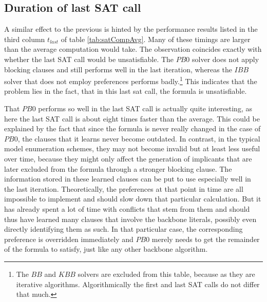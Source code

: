 



\subsection{Duration of last SAT call}
\label{ss:durLastCall}
A similar effect to the previous is hinted by the performance results listed in the third column $t_{last}$ of table \ref{tab:satCompAvg}. Many of these timings are larger than the average computation would take. The observation coincides exactly with whether the last SAT call would be unsatisfiable. The $PB0$ solver does not apply blocking clauses and still performs well in the last iteration, whereas the $IBB$ solver that does not employ preferences performs badly.\footnote{The $BB$ and $KBB$ solvers are excluded from this table, because as they are iterative algorithms. Algorithmically the first and last SAT calls do not differ that much.} This indicates that the problem lies in the fact, that in this last sat call, the formula is unsatisfiable.

That $PB0$ performs so well in the last SAT call is actually quite interesting, as here the last SAT call is about eight times faster than the average. This could be explained by the fact that since the formula is never really changed in the case of $PB0$, the clauses that it learns never become outdated. In contrast, in the typical model enumeration schemes, they may not become invalid but at least less useful over time, because they might only affect the generation of implicants that are later excluded from the formula through a stronger blocking clause. The information stored in these learned clauses can be put to use especially well in the last iteration. Theoretically, the preferences at that point in time are all impossible to implement and should slow down that particular calculation. 
But it has already spent a lot of time with conflicts that stem from them and should thus have learned many clauses that involve the backbone literals, possibly even directly identifying them as such. In that particular case, the corresponding preference is overridden immediately and $PB0$ merely needs to get the remainder of the formula to satisfy, just like any other backbone algorithm.

